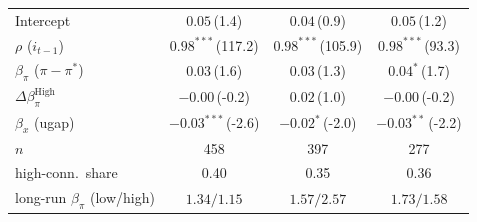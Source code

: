 \begin{tabular}{lccc}
Intercept & $0.05$\,{\scriptsize(1.4)} & $0.04$\,{\scriptsize(0.9)} & $0.05$\,{\scriptsize(1.2)} \\
$\rho$ ($i_{t-1}$) & $0.98^{***}$\,{\scriptsize(117.2)} & $0.98^{***}$\,{\scriptsize(105.9)} & $0.98^{***}$\,{\scriptsize(93.3)} \\
$\beta_\pi$ ($\pi-\pi^*$) & $0.03$\,{\scriptsize(1.6)} & $0.03$\,{\scriptsize(1.3)} & $0.04^{*}$\,{\scriptsize(1.7)} \\
$\Delta\beta_\pi^{\text{High}}$ & $-0.00$\,{\scriptsize(-0.2)} & $0.02$\,{\scriptsize(1.0)} & $-0.00$\,{\scriptsize(-0.2)} \\
$\beta_x$ (ugap) & $-0.03^{***}$\,{\scriptsize(-2.6)} & $-0.02^{*}$\,{\scriptsize(-2.0)} & $-0.03^{**}$\,{\scriptsize(-2.2)} \\
\addlinespace
$n$ & 458 & 397 & 277 \\
high-conn.\ share & 0.40 & 0.35 & 0.36 \\
long-run $\beta_\pi$ (low/high) & $1.34/1.15$ & $1.57/2.57$ & $1.73/1.58$ \\
\bottomrule
\end{tabular}
